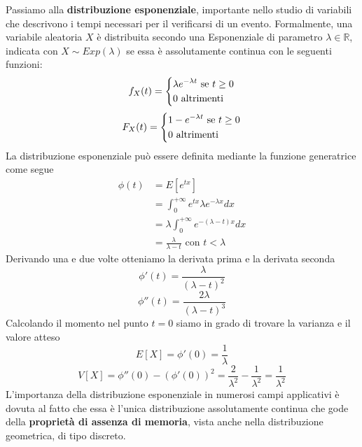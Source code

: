 \documentclass[a4paper,12pt, oneside]{book}
\newcommand{\numberset}{\mathbb}
\newcommand{\R}{\numberset{R}}
\begin{document}
Passiamo alla \textbf{distribuzione esponenziale}, importante nello studio di variabili che descrivono i tempi
necessari per il verificarsi di un evento.\newline
Formalmente, una variabile aleatoria $X$ è distribuita secondo una Esponenziale di parametro $\lambda \in \R$,
indicata con $X \sim Exp(\lambda)$ se essa è assolutamente continua con le seguenti funzioni:
\[f_X(t) = \begin{dcases}
            \lambda e^{-\lambda t} \mbox{ se } t \geq 0\\
            0 \mbox{ altrimenti}
            \end{dcases}\]
\[F_X(t) = \begin{dcases}
            1 - e^{-\lambda t} \mbox{ se } t \geq 0\\
            0 \mbox{ altrimenti}
            \end{dcases}\]
La distribuzione esponenziale può essere definita mediante la funzione generatrice come segue
\[ \begin{split}
    \phi(t) & = E[e^{tx}] \\
            & = \int _0 ^{+\infty} e^{tx} \lambda e^{-\lambda x} dx\\
            & = \lambda \int _0 ^{+\infty} e^{-(\lambda - t)x} dx\\
            & = \frac{\lambda}{\lambda - t} \mbox{ con $t < \lambda$}
    \end{split} \]
Derivando una e due volte otteniamo la derivata prima e la derivata seconda
\[ \phi'(t) = \frac{\lambda}{(\lambda - t)^2} \]
\[ \phi''(t) = \frac{2\lambda}{(\lambda - t)^3} \]
Calcolando il momento nel punto $t = 0$ siamo in grado di trovare la varianza e il valore atteso 
\[E[X] = \phi'(0) = \frac{1}{\lambda}\]
\[V[X] = \phi''(0) - (\phi'(0))^2 = \frac{2}{\lambda^2} - \frac{1}{\lambda^2} = \frac{1}{\lambda^2} \]
L'importanza della distribuzione esponenziale in numerosi campi applicativi è dovuta al fatto che essa è
l'unica distribuzione assolutamente continua che gode della \textbf{proprietà di assenza di memoria}, vista
anche nella distribuzione geometrica, di tipo discreto.
\end{document}
